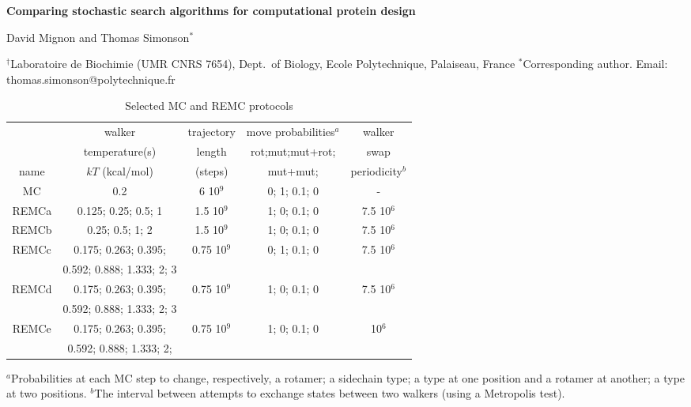 \documentclass[a4paper,12pt]{article}
\begin{document}
 

\parindent 0mm

\begin{center}

\large 
{\bf Comparing stochastic search algorithms for computational protein design}
\bigskip

\normalsize
David Mignon and Thomas Simonson$^{\ast}$

\vspace{1mm}

$^{\dag}$Laboratoire de Biochimie (UMR CNRS 7654), Dept.\ of Biology, 
Ecole Polytechnique, Palaiseau, France 
$^{\ast}$Corresponding author. Email: thomas.simonson@polytechnique.fr 

\end{center}
\parindent 8mm




\begin{table}[H]                            
\caption{Selected MC and REMC protocols}
\label{tab:parameters}                      
\begin{center} \small 
\renewcommand{\arraystretch}{0.75}
\begin{tabular}{ccccc} \hline \hline  
      &  walker                   & trajectory & move probabilities$^a$ & walker     \\ 
      &  temperature(s)           & length     & rot;mut;mut+rot; & swap       \\ 
name  & $kT$ (kcal/mol)           & (steps)    & mut+mut;         & periodicity$^b$ \smallskip \\  \hline 
MC    & 0.2                       &   6 10$^9$ & 0; 1; 0.1; 0     &  -          \smallskip \\      
REMCa & 0.125; 0.25; 0.5; 1       & 1.5 10$^9$ & 1; 0; 0.1; 0     & 7.5 10$^6$  \smallskip \\   
REMCb & 0.25; 0.5; 1; 2           & 1.5 10$^9$ & 1; 0; 0.1; 0     & 7.5 10$^6$  \smallskip \\ 
REMCc & 0.175; 0.263; 0.395;      & 0.75 10$^9$& 0; 1; 0.1; 0     & 7.5 10$^6$  \\
      & 0.592; 0.888; 1.333; 2; 3 &  &  &  \smallskip \\
REMCd & 0.175; 0.263; 0.395;      &0.75 10$^9$ & 1; 0; 0.1; 0     & 7.5 10$^6$  \\
      & 0.592; 0.888; 1.333; 2; 3 &  &  &  \smallskip \\
REMCe & 0.175; 0.263; 0.395;      &0.75 10$^9$ & 1; 0; 0.1; 0     &     10$^6$  \\ 
      & 0.592; 0.888; 1.333; 2;   &  &  &  \smallskip \\ \hline
\end{tabular}
\end{center}
{\small \noindent $^a$Probabilities at each MC step to change, respectively, a
rotamer; a sidechain type; a type at one position and a rotamer at another;
a type at two positions. $^b$The interval between attempts to exchange states
between two walkers (using a Metropolis test).
}
\end{table}
\end{document}
